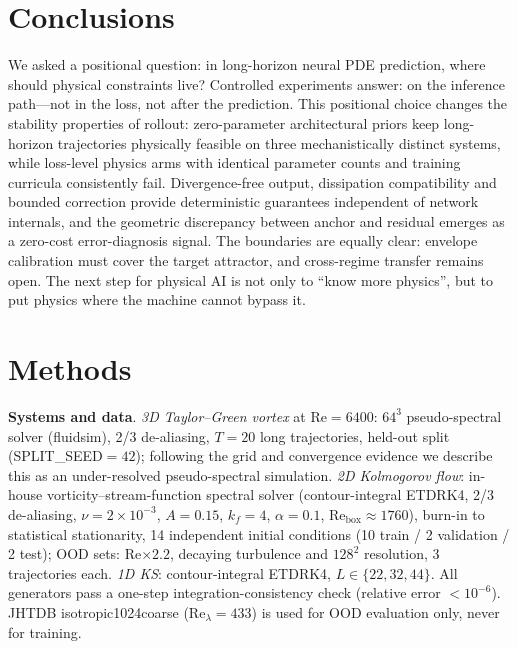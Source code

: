 \documentclass[11pt,a4paper]{article}
\begin{document}
\section{Conclusions}

We asked a positional question: in long-horizon neural PDE prediction, where should physical constraints live? Controlled experiments answer: on the inference path---not in the loss, not after the prediction. This positional choice changes the stability properties of rollout: zero-parameter architectural priors keep long-horizon trajectories physically feasible on three mechanistically distinct systems, while loss-level physics arms with identical parameter counts and training curricula consistently fail. Divergence-free output, dissipation compatibility and bounded correction provide deterministic guarantees independent of network internals, and the geometric discrepancy between anchor and residual emerges as a zero-cost error-diagnosis signal. The boundaries are equally clear: envelope calibration must cover the target attractor, and cross-regime transfer remains open. The next step for physical AI is not only to ``know more physics'', but to put physics where the machine cannot bypass it.

\section{Methods}

\textbf{Systems and data}. \emph{3D Taylor--Green vortex\cite{taylor1937}} at Re$=6400$: $64^3$ pseudo-spectral solver (fluidsim\cite{mohanan2019fluidsim}), 2/3 de-aliasing, $T{=}20$ long trajectories, held-out split (SPLIT\_SEED$=42$); following the grid and convergence evidence we describe this as an under-resolved pseudo-spectral simulation. \emph{2D Kolmogorov flow}: in-house vorticity--stream-function spectral solver (contour-integral ETDRK4\cite{cox2002etdrk4,kassam2005}, 2/3 de-aliasing, $\nu{=}2{\times}10^{-3}$, $A{=}0.15$, $k_f{=}4$, $\alpha{=}0.1$, $\mathrm{Re}_{\mathrm{box}}{\approx}1760$), burn-in to statistical stationarity, 14 independent initial conditions (10 train / 2 validation / 2 test); OOD sets: Re$\times2.2$, decaying turbulence and $128^2$ resolution, 3 trajectories each. \emph{1D KS}\cite{kuramoto1976,sivashinsky1977}: contour-integral ETDRK4, $L\in\{22,32,44\}$. All generators pass a one-step integration-consistency check (relative error $<10^{-6}$). JHTDB isotropic1024coarse\cite{li2008jhtdb} ($\mathrm{Re}_\lambda{=}433$) is used for OOD evaluation only, never for training.
\end{document}
